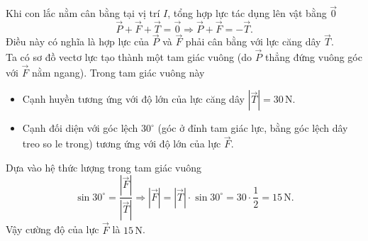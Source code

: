 \begin{ex}
{	Khi con lắc nằm cân bằng tại vị trí $I$, tổng hợp lực tác dụng lên vật bằng $\vec{0}$
	\[ \overrightarrow{P} + \overrightarrow{F} + \overrightarrow{T} = \vec{0} \Rightarrow \overrightarrow{P} + \overrightarrow{F} = -\overrightarrow{T}. \]
	Điều này có nghĩa là hợp lực của $\overrightarrow{P}$ và $\overrightarrow{F}$ phải cân bằng với lực căng dây $\overrightarrow{T}$.\\
	Ta có sơ đồ vectơ lực tạo thành một tam giác vuông (do $\overrightarrow{P}$ thẳng đứng vuông góc với $\overrightarrow{F}$ nằm ngang). Trong tam giác vuông này
	\begin{itemize}
		\item Cạnh huyền tương ứng với độ lớn của lực căng dây $|\overrightarrow{T}| = 30\,\text{N}$.
		\item Cạnh đối diện với góc lệch $30^\circ$ (góc ở đỉnh tam giác lực, bằng góc lệch dây treo so le trong) tương ứng với độ lớn của lực $\overrightarrow{F}$.
	\end{itemize}
	Dựa vào hệ thức lượng trong tam giác vuông
	\[ \sin 30^\circ = \dfrac{|\overrightarrow{F}|}{|\overrightarrow{T}|} \Rightarrow |\overrightarrow{F}| = |\overrightarrow{T}| \cdot \sin 30^\circ=30 \cdot \dfrac{1}{2} = 15\,\text{N}. \]
	Vậy cường độ của lực $\overrightarrow{F}$ là $15\,\text{N}$.
	}
\end{ex}
 
\setcounter{ex}{0}
